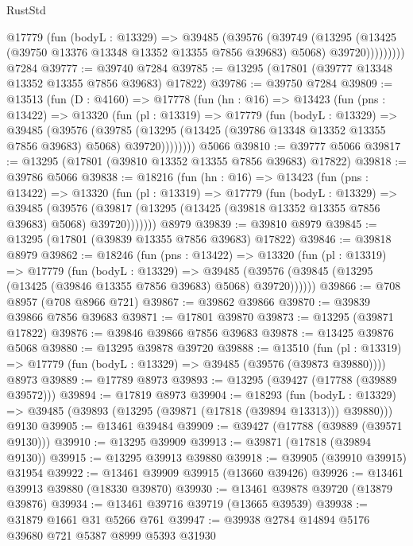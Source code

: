\begin{lexlean}{RustStd}
\begin{coremodule}
            @17779
              (fun (bodyL : @13329) =>
              @39485
                (@39576
                  (@39749
                    (@13295
                      (@13425 (@39750 @13376 @13348 @13352 @13355 @7856 @39683) @5068)
                      @39720)))))))))
    @7284
@39777 := @39740 @7284
@39785 := @13295 (@17801 (@39777 @13348 @13352 @13355 @7856 @39683) @17822)
@39786 := @39750 @7284
@39809 := @13513
    (fun (D : @4160) =>
    @17778
      (fun (hn : @16) =>
      @13423
        (fun (pns : @13422) =>
        @13320
          (fun (pl : @13319) =>
          @17779
            (fun (bodyL : @13329) =>
            @39485
              (@39576
                (@39785
                  (@13295 (@13425 (@39786 @13348 @13352 @13355 @7856 @39683) @5068) @39720))))))))
    @5066
@39810 := @39777 @5066
@39817 := @13295 (@17801 (@39810 @13352 @13355 @7856 @39683) @17822)
@39818 := @39786 @5066
@39838 := @18216
    (fun (hn : @16) =>
    @13423
      (fun (pns : @13422) =>
      @13320
        (fun (pl : @13319) =>
        @17779
          (fun (bodyL : @13329) =>
          @39485
            (@39576 (@39817 (@13295 (@13425 (@39818 @13352 @13355 @7856 @39683) @5068) @39720)))))))
    @8979
@39839 := @39810 @8979
@39845 := @13295 (@17801 (@39839 @13355 @7856 @39683) @17822)
@39846 := @39818 @8979
@39862 := @18246
    (fun (pns : @13422) =>
    @13320
      (fun (pl : @13319) =>
      @17779
        (fun (bodyL : @13329) =>
        @39485 (@39576 (@39845 (@13295 (@13425 (@39846 @13355 @7856 @39683) @5068) @39720))))))
@39866 := @708 @8957 (@708 @8966 @721)
@39867 := @39862 @39866
@39870 := @39839 @39866 @7856 @39683
@39871 := @17801 @39870
@39873 := @13295 (@39871 @17822)
@39876 := @39846 @39866 @7856 @39683
@39878 := @13425 @39876 @5068
@39880 := @13295 @39878 @39720
@39888 := @13510
    (fun (pl : @13319) => @17779 (fun (bodyL : @13329) => @39485 (@39576 (@39873 @39880))))
    @8973
@39889 := @17789 @8973
@39893 := @13295 (@39427 (@17788 (@39889 @39572)))
@39894 := @17819 @8973
@39904 := @18293
    (fun (bodyL : @13329) => @39485 (@39893 (@13295 (@39871 (@17818 (@39894 @13313))) @39880)))
    @9130
@39905 := @13461 @39484
@39909 := @39427 (@17788 (@39889 (@39571 @9130)))
@39910 := @13295 @39909
@39913 := @39871 (@17818 (@39894 @9130))
@39915 := @13295 @39913 @39880
@39918 := @39905 (@39910 @39915) @31954
@39922 := @13461 @39909 @39915 (@13660 @39426)
@39926 := @13461 @39913 @39880 (@18330 @39870)
@39930 := @13461 @39878 @39720 (@13879 @39876)
@39934 := @13461 @39716 @39719 (@13665 @39539)
@39938 := @31879 @1661 @31 @5266 @761
@39947 := @39938 @2784 @14894 @5176 @39680 @721 @5387 @8999 @5393 @31930

\end{coremodule}
\end{lexlean}
